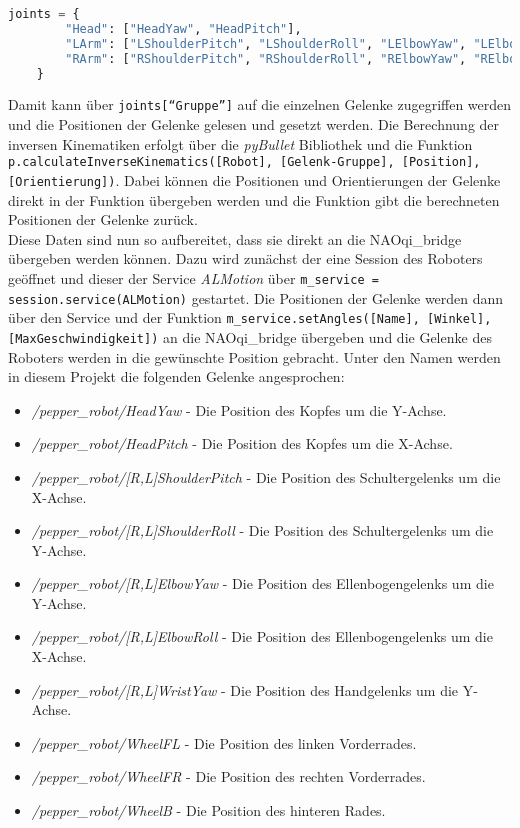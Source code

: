 \begin{lstlisting}[language=Python, caption=Gelenk-Grupperierung, label=lst:gelenk-grupperierung]
    joints = {
        "Head": ["HeadYaw", "HeadPitch"],
        "LArm": ["LShoulderPitch", "LShoulderRoll", "LElbowYaw", "LElbowRoll", "LWristYaw"],
        "RArm": ["RShoulderPitch", "RShoulderRoll", "RElbowYaw", "RElbowRoll", "RWristYaw"]
    }
\end{lstlisting}
Damit kann über \texttt{joints[``Gruppe'']} auf die einzelnen Gelenke zugegriffen werden und die Positionen der Gelenke gelesen und gesetzt werden. Die Berechnung der inversen Kinematiken erfolgt über die \textit{pyBullet} Bibliothek und die Funktion \texttt{p.calculateInverseKinematics([Robot], [Gelenk-Gruppe], [Position], [Orientierung])}. Dabei können die Positionen und Orientierungen der Gelenke direkt in der Funktion übergeben werden und die Funktion gibt die berechneten Positionen der Gelenke zurück.\\
Diese Daten sind nun so aufbereitet, dass sie direkt an die NAOqi\_bridge übergeben werden können. Dazu wird zunächst der eine Session des Roboters geöffnet und dieser der Service \textit{ALMotion} über \texttt{m\_service = session.service(ALMotion)} gestartet. Die Positionen der Gelenke werden dann über den Service und der Funktion \texttt{m\_service.setAngles([Name], [Winkel], [MaxGeschwindigkeit])} an die NAOqi\_bridge übergeben und die Gelenke des Roboters werden in die gewünschte Position gebracht. Unter den Namen werden in diesem Projekt die folgenden Gelenke angesprochen:
\begin{itemize}
    \item \textit{/pepper\_robot/HeadYaw} - Die Position des Kopfes um die Y-Achse.
    \item \textit{/pepper\_robot/HeadPitch} - Die Position des Kopfes um die X-Achse.
    \item \textit{/pepper\_robot/[R,L]ShoulderPitch} - Die Position des Schultergelenks um die X-Achse.
    \item \textit{/pepper\_robot/[R,L]ShoulderRoll} - Die Position des Schultergelenks um die Y-Achse.
    \item \textit{/pepper\_robot/[R,L]ElbowYaw} - Die Position des Ellenbogengelenks um die Y-Achse.
    \item \textit{/pepper\_robot/[R,L]ElbowRoll} - Die Position des Ellenbogengelenks um die X-Achse.
    \item \textit{/pepper\_robot/[R,L]WristYaw} - Die Position des Handgelenks um die Y-Achse.
    \item \textit{/pepper\_robot/WheelFL} - Die Position des linken Vorderrades.
    \item \textit{/pepper\_robot/WheelFR} - Die Position des rechten Vorderrades.
    \item \textit{/pepper\_robot/WheelB} - Die Position des hinteren Rades.
\end{itemize}

